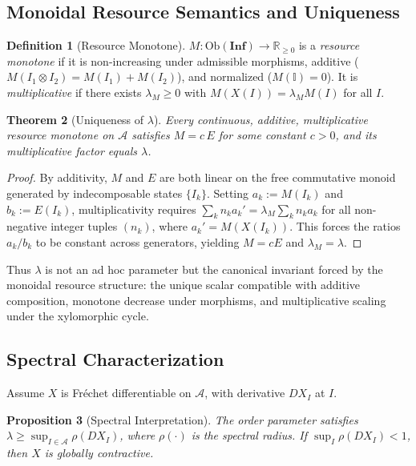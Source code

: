 \documentclass[10pt,twocolumn]{article}
\theoremstyle{plain}
\newtheorem{theorem}{Theorem}
\newtheorem{proposition}[theorem]{Proposition}
\theoremstyle{definition}
\newtheorem{definition}[theorem]{Definition}
\theoremstyle{remark}
\begin{document}
\subsection{Monoidal Resource Semantics and Uniqueness}

\begin{definition}[Resource Monotone]
$M : \mathrm{Ob}(\mathbf{Inf}) \to \mathbb{R}_{\geq 0}$ is a
\emph{resource monotone} if it is non-increasing under admissible
morphisms, additive ($M(I_1 \otimes I_2) = M(I_1) + M(I_2)$), and
normalized ($M(\mathbb{I}) = 0$). It is \emph{multiplicative} if there
exists $\lambda_M \geq 0$ with $M(X(I)) = \lambda_M M(I)$ for all $I$.
\end{definition}

\begin{theorem}[Uniqueness of $\lambda$]
\label{thm:unique}
Every continuous, additive, multiplicative resource monotone on
$\mathcal{A}$ satisfies $M = c\,E$ for some constant $c > 0$, and its
multiplicative factor equals $\lambda$.
\end{theorem}

\begin{proof}
By additivity, $M$ and $E$ are both linear on the free commutative
monoid generated by indecomposable states $\{I_k\}$. Setting $a_k :=
M(I_k)$ and $b_k := E(I_k)$, multiplicativity requires
$\sum_k n_k a_k' = \lambda_M \sum_k n_k a_k$ for all non-negative
integer tuples $(n_k)$, where $a_k' = M(X(I_k))$. This forces the
ratios $a_k / b_k$ to be constant across generators, yielding $M = cE$
and $\lambda_M = \lambda$.
\end{proof}

Thus $\lambda$ is not an ad hoc parameter but the canonical invariant
forced by the monoidal resource structure: the unique scalar compatible
with additive composition, monotone decrease under morphisms, and
multiplicative scaling under the xylomorphic cycle.

\subsection{Spectral Characterization}

Assume $X$ is Fréchet differentiable on $\mathcal{A}$, with derivative
$DX_I$ at $I$.

\begin{proposition}[Spectral Interpretation]
The order parameter satisfies $\lambda \geq \sup_{I \in \mathcal{A}}
\rho(DX_I)$, where $\rho(\cdot)$ is the spectral radius. If
$\sup_I \rho(DX_I) < 1$, then $X$ is globally contractive.
\end{proposition}
\end{document}
